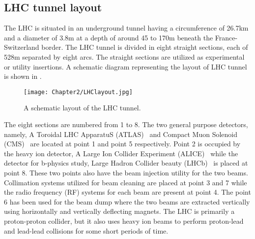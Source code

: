 \subsection{LHC tunnel layout}
The LHC is situated in an underground tunnel having a circumference of 26.7\unit{km} and a diameter of 3.8\unit{m}
at a depth of around 45 to 170\unit{m} beneath the France-Switzerland border. The LHC tunnel is divided in eight straight sections,
each of 528\unit{m} separated by eight arcs. The straight sections are utilized as experimental or utility insertions. 
A schematic diagram representing the layout of LHC tunnel is shown in \fig{\ref{fig:LHClayout}}. 
\begin{figure}[h]
\begin{center}
\texttt{[image: Chapter2/LHClayout.jpg]}
\caption{A schematic layout of the LHC tunnel.}
\label{fig:LHClayout}
\end{center}
\end{figure}

The eight sections are numbered from 1 to 8. The two general purpose detectors, namely,
A Toroidal LHC ApparatuS (ATLAS)~\cite{atlasTDR} and Compact Muon Solenoid (CMS)~\cite{cmsTDR} are located at point 1 and point 5 respectively. 
Point 2 is occupied by the heavy ion detector, A Large Ion Collider Experiment (ALICE)~\cite{aliceTDR} while the detector for b-physics
study, Large Hadron Collider beauty (LHCb)~\cite{lhcbTDR} is placed at point 8. These two points also have the beam injection utility for the two beams.
Collimation systems utilized for beam cleaning are placed at point 3 and 7 while the radio frequency (RF) systems for each beam are present at point 4.  
The point 6 has been used for the beam dump where the two beams are extracted vertically using horizontally and vertically deflecting magnets.
The LHC is primarily a proton-proton collider, but it also uses heavy ion beams to perform proton-lead and lead-lead collisions for some short periods of time.

